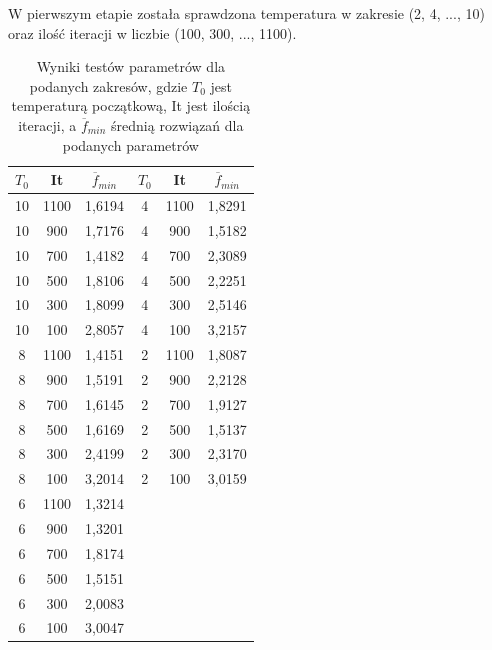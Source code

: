 \documentclass[twoside]{projektInzynierskiMS1}
\newcommand{\si}{ś}
\begin{document}
W pierwszym etapie została sprawdzona temperatura w zakresie (2, 4, ..., 10) oraz ilo\si ć iteracji w liczbie (100, 300, ..., 1100). \\
\begin{table}[htbp]\centering
\def\sym#1{\ifmmode^{#1}\else\(^{#1}\)\fi}
\caption{Wyniki testów parametrów dla podanych zakresów, gdzie $T_0$ jest temperaturą początkową, It jest ilo\si cią iteracji, a $\overline{f}_{min}$ \si rednią rozwiązań dla podanych parametrów}
\renewcommand\arraystretch{1.333}
\begin{tabular}{|c|c|c||c|c|c|} 
                  \hline
                  \textbf{$T_0$}
                  & \textbf{It}
                  &\textbf{$\overline{f}_{min}$} 
& \textbf{$T_0$}
 & \textbf{It}
 &\textbf{$\overline{f}_{min}$} \\ \hline

10 & 1100 & 1,6194 &4 & 1100 & 1,8291 \\ \hline
10 & 900 & 1,7176 &4 & 900 & 1,5182 \\ \hline
10 & 700 & 1,4182&4 & 700 & 2,3089 \\ \hline
10 & 500 & 1,8106&4 & 500 & 2,2251 \\ \hline
10 & 300 & 1,8099 &4 & 300 & 2,5146 \\ \hline 
10 & 100 & 2,8057&4 & 100 & 3,2157 \\ \Xhline{3\arrayrulewidth}

8 & 1100 & 1,4151 &2 & 1100 & 1,8087 \\ \hline 
8 & 900 & 1,5191 &2 & 900 & 2,2128 \\ \hline 
8 & 700 & 1,6145 &2 & 700 & 1,9127 \\ \hline
8 & 500 & 1,6169 &2 & 500 & 1,5137 \\ \hline 
8 & 300 & 2,4199 &2 & 300 & 2,3170 \\ \hline 
8 & 100 & 3,2014 &2 & 100 & 3,0159 \\ \Xhline{3\arrayrulewidth}

6 & 1100 & 1,3214 \\ \hline 
6 & 900 & 1,3201 \\ \hline 
6 & 700 & 1,8174 \\ \hline 
6 & 500 & 1,5151 \\ \hline 
6 & 300 & 2,0083 \\ \hline 
6 & 100 & 3,0047 \\ \hline 
\end{tabular}
\end{table}
\end{document}
